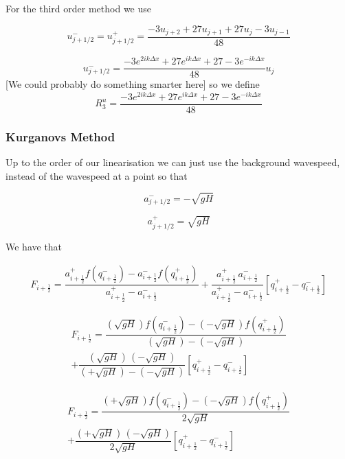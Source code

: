 \documentclass[12pt]{article}
\begin{document}
For the third order method we use

\[u^-_{j + 1/2} = u^+_{j + 1/2} = \frac{-3u_{j+2} + 27u_{j+1} + 27u_{j} - 3u_{j-1}}{48}\]

\[u^-_{j + 1/2}  = \frac{-3e^{2ik\Delta x } + 27e^{ik\Delta x } + 27 - 3e^{-ik\Delta x }}{48} u_j\]
[We could probably do something smarter here]
so we define 
\[R^u_3 = \frac{-3e^{2ik\Delta x } + 27e^{ik\Delta x } + 27 - 3e^{-ik\Delta x }}{48}\]

\subsubsection{Kurganovs Method}
Up to the order of our linearisation we can just use the background wavespeed, instead of the wavespeed at a point so that

\[a^-_{j+ 1/2} =  - \sqrt{g H}\]

\[a^+_{j+ 1/2} = \sqrt{g H}\]


We have that 

\begin{gather}\label{eq:HLL_flux}
F_{i+\frac{1}{2}} = \dfrac{a^+_{i+\frac{1}{2}} f\left(q^-_{i+\frac{1}{2}}\right) - a^-_{i+\frac{1}{2}} f\left(q^+_{i+\frac{1}{2}}\right)}{a^+_{i+\frac{1}{2}} - a^-_{i+\frac{1}{2}}}  + \dfrac{a^+_{i+\frac{1}{2}} \, a^-_{i+\frac{1}{2}}}{a^+_{i+\frac{1}{2}} - a^-_{i+\frac{1}{2}}} \left [ q^+_{i+\frac{1}{2}} - q^-_{i+\frac{1}{2}} \right ]
\end{gather}

\begin{multline}
F_{i+\frac{1}{2}} = \dfrac{\left(\sqrt{g H}\right) f\left(q^-_{i+\frac{1}{2}}\right) - \left( - \sqrt{g H}\right) f\left(q^+_{i+\frac{1}{2}}\right)}{\left(\sqrt{g H}\right) - \left( - \sqrt{g H}\right)} \\ + \dfrac{\left( \sqrt{g H}\right) \, \left( - \sqrt{g H}\right)}{\left( + \sqrt{g H}\right) - \left( - \sqrt{g H}\right)} \left [ q^+_{i+\frac{1}{2}} - q^-_{i+\frac{1}{2}} \right ]
\end{multline}

\begin{multline}
F_{i+\frac{1}{2}} = \dfrac{\left(+ \sqrt{g H}\right) f\left(q^-_{i+\frac{1}{2}}\right) - \left( - \sqrt{g H}\right) f\left(q^+_{i+\frac{1}{2}}\right)}{ 2\sqrt{g H}} \\ + \dfrac{\left( + \sqrt{g H}\right) \, \left( - \sqrt{g H}\right)}{{ 2\sqrt{gH}}} \left [ q^+_{i+\frac{1}{2}} - q^-_{i+\frac{1}{2}} \right ]
\end{multline}
\end{document}
